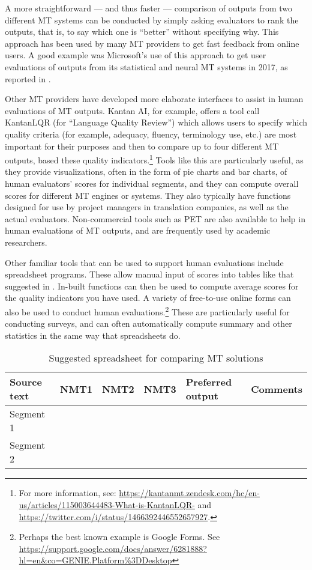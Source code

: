 \documentclass[output=paper]{langscibook}
\begin{document}
A more straightforward — and thus faster — comparison of outputs from two different MT systems can be conducted by simply asking evaluators to rank the outputs, that is, to say which one is “better” without specifying why. This approach has been used by many MT providers to get fast feedback from online users. A good example was Microsoft’s use of this approach to get user evaluations of outputs from its statistical and neural MT systems in 2017, as reported in \citet{Moorkens2018}. 

Other MT providers have developed more elaborate interfaces to assist in human evaluations of MT outputs. Kantan AI, for example, offers a tool call KantanLQR (for “Language Quality Review”) which allows users to specify which quality criteria (for example, adequacy, fluency, terminology use, etc.) are most important for their purposes and then to compare up to four different MT outputs, based these quality indicators.\footnote{For more information, see: \url{https://kantanmt.zendesk.com/hc/en-us/articles/115003644483-What-is-KantanLQR-} and \url{https://twitter.com/i/status/1466392446552657927}.} Tools like this are particularly useful, as they provide visualizations, often in the form of pie charts and bar charts, of human evaluators’ scores for individual segments, and they can compute overall scores for different MT engines or systems. They also typically have functions designed for use by project managers in translation companies, as well as the actual evaluators. Non-commercial tools such as PET \citep{AzizSpecia2012} are also available to help in human evaluations of MT outputs, and are frequently used by academic researchers.

Other familiar tools that can be used to support human evaluations include spreadsheet programs. These allow manual input of scores into tables like that suggested in . In-built functions can then be used to compute average scores for the quality indicators you have used. A variety of free-to-use online forms can also be used to conduct human evaluations.\footnote{Perhaps the best known example is Google Forms. See \url{https://support.google.com/docs/answer/6281888?hl=en\&co=GENIE.Platform\%3DDesktop}} These are particularly useful for conducting surveys, and can often automatically compute summary and other statistics in the same way that spreadsheets do.

\begin{table}
\begin{tabularx}{\textwidth}{|l|X|X|X|l|l|}
\hline
{Source text} & {NMT1} & {NMT2} & {NMT3} & {Preferred output} & {Comments}\\
\hline
Segment 1&  &  &  &  &\\
\hline
Segment 2 &  &  &  &  & \\
\hline
\end{tabularx}
\caption{Suggested spreadsheet for comparing MT solutions}
\label{tab:rossi:3}
\end{table}
\end{document}
